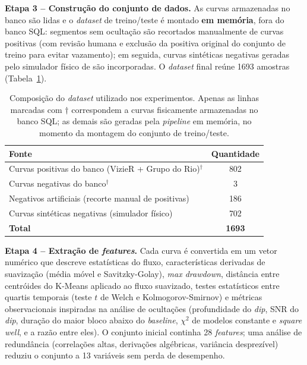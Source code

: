\documentclass[12pt]{article}
\numberwithin{equation}{section}
\begin{document}
\textbf{Etapa 3 -- Construção do conjunto de dados.} As curvas armazenadas no banco são lidas e o \textit{dataset} de treino/teste é montado \textbf{em memória}, fora do banco SQL: segmentos sem ocultação são recortados manualmente de curvas positivas (com revisão humana e exclusão da positiva original do conjunto de treino para evitar vazamento); em seguida, curvas sintéticas negativas geradas pelo simulador físico de \cite{Simulator} são incorporadas. O \textit{dataset} final reúne 1693 amostras (Tabela~\ref{tab:dataset_fonte}).

\begin{table}[!h]
\centering
\caption{Composição do \textit{dataset} utilizado nos experimentos. Apenas as linhas marcadas com $\dagger$ correspondem a curvas fisicamente armazenadas no banco SQL; as demais são geradas pela \textit{pipeline} em memória, no momento da montagem do conjunto de treino/teste.}
\label{tab:dataset_fonte}
\begin{tabular}{lc}
\toprule
\textbf{Fonte} & \textbf{Quantidade} \\
\midrule
Curvas positivas do banco (VizieR + Grupo do Rio)$^\dagger$ & 802 \\
Curvas negativas do banco$^\dagger$ & 3 \\
Negativos artificiais (recorte manual de positivas) & 186 \\
Curvas sintéticas negativas (simulador físico) & 702 \\
\midrule
\textbf{Total} & \textbf{1693} \\
\bottomrule
\end{tabular}
\end{table}

\textbf{Etapa 4 -- Extração de \textit{features}.} Cada curva é convertida em um vetor numérico que descreve estatísticas do fluxo, características derivadas de suavização (média móvel e Savitzky-Golay), \textit{max drawdown}, distância entre centróides do K-Means aplicado ao fluxo suavizado, testes estatísticos entre quartis temporais (teste $t$ de Welch e Kolmogorov-Smirnov) e métricas observacionais inspiradas na análise de ocultações (profundidade do \textit{dip}, SNR do \textit{dip}, duração do maior bloco abaixo do \textit{baseline}, $\chi^2$ de modelos constante e \textit{square well}, e a razão entre eles). O conjunto inicial continha 28 \textit{features}; uma análise de redundância (correlações altas, derivações algébricas, variância desprezível) reduziu o conjunto a 13 variáveis sem perda de desempenho.
\end{document}
